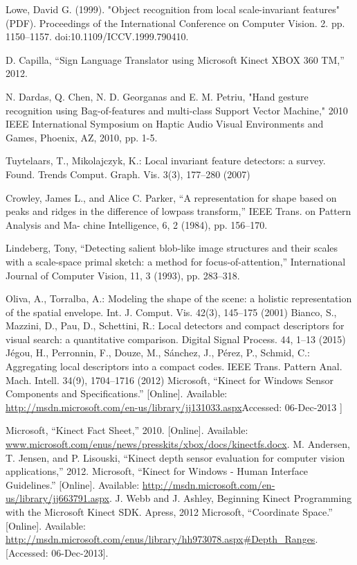 \documentclass[12pt]{report}           %
\begin{document}
\begin{thebibliography}{80}
Lowe, David G. (1999). "Object recognition from local scale-invariant features" (PDF). Proceedings of the International Conference on Computer Vision. 2. pp. 1150–1157. doi:10.1109/ICCV.1999.790410.



 D. Capilla, “Sign Language Translator using Microsoft Kinect XBOX 360 TM,” 2012. 


N. Dardas, Q. Chen, N. D. Georganas and E. M. Petriu, "Hand gesture recognition using Bag-of-features and multi-class Support Vector Machine," 2010 IEEE International Symposium on Haptic Audio Visual Environments and Games, Phoenix, AZ, 2010, pp. 1-5.


 Tuytelaars, T., Mikolajczyk, K.: Local invariant feature detectors: a survey. Found. Trends
Comput. Graph. Vis. 3(3), 177–280 (2007)




 Crowley, James L., and Alice C. Parker, “A representation
for shape based on peaks and ridges in the difference of lowpass transform,”
IEEE Trans. on Pattern Analysis and Ma-
chine Intelligence,
6, 2 (1984), pp. 156–170.

Lindeberg, Tony, “Detecting salient blob-like image structures and their scales with a scale-space primal sketch:
a method for focus-of-attention,”
International Journal of
Computer Vision,
11, 3 (1993), pp. 283–318.



 Oliva, A., Torralba, A.: Modeling the shape of the scene: a holistic representation of the spatial
envelope. Int. J. Comput. Vis. 42(3), 145–175 (2001)
 Bianco, S., Mazzini, D., Pau, D., Schettini, R.: Local detectors and compact descriptors for
visual search: a quantitative comparison. Digital Signal Process. 44, 1–13 (2015)
 Jégou, H., Perronnin, F., Douze, M., Sánchez, J., Pérez, P., Schmid, C.: Aggregating local
descriptors into a compact codes. IEEE Trans. Pattern Anal. Mach. Intell. 34(9), 1704–1716
(2012)
Microsoft, “Kinect for Windows Sensor Components and Specifications.” [Online]. Available: \url{http://msdn.microsoft.com/en-us/library/jj131033.aspx}Accessed: 06-Dec-2013 ]

 Microsoft, “Kinect Fact Sheet,” 2010. [Online]. Available: \url{www.microsoft.com/enus/news/presskits/xbox/docs/kinectfs.docx}.
M. Andersen, T. Jensen, and P. Lisouski, “Kinect depth sensor evaluation for computer
vision applications,” 2012.
Microsoft, “Kinect for Windows - Human Interface Guidelines.” [Online]. Available:
\url{http://msdn.microsoft.com/en-us/library/jj663791.aspx}.
J. Webb and J. Ashley, Beginning Kinect Programming with the Microsoft Kinect SDK.
Apress, 2012
Microsoft, “Coordinate Space.” [Online]. Available: \url{http://msdn.microsoft.com/enus/library/hh973078.aspx#Depth\_Ranges}.
[Accessed: 06-Dec-2013].


\end{thebibliography}
\end{document}
